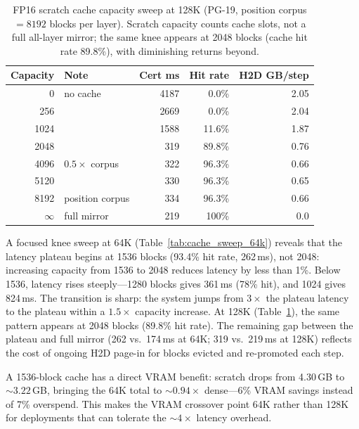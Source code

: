 \documentclass[11pt,a4paper]{article}
\theoremstyle{definition}
\theoremstyle{remark}
\begin{document}
\begin{table}[H]
\centering
\caption{FP16 scratch cache capacity sweep at 128K (PG-19, position corpus${}=8192$ blocks per layer).  Scratch capacity counts cache slots, not a full all-layer mirror; the same knee appears at 2048 blocks (cache hit rate 89.8\%), with diminishing returns beyond.}
\label{tab:cache_sweep_128k}
\small
\begin{tabular}{rlrrr}
\toprule
\textbf{Capacity} & \textbf{Note} & \textbf{Cert ms} & \textbf{Hit rate} & \textbf{H2D GB/step} \\
\midrule
0       & no cache       & 4187 & 0.0\%   & 2.05 \\
256     &                & 2669 & 0.0\%   & 2.04 \\
1024    &                & 1588 & 11.6\%  & 1.87 \\
\rowcolor[gray]{0.92}
2048    &                & 319  & 89.8\%  & 0.76 \\
4096    & $0.5\times$ corpus & 322 & 96.3\% & 0.66 \\
5120    &                & 330  & 96.3\%  & 0.65 \\
8192    & position corpus & 334 & 96.3\% & 0.66 \\
\rowcolor[gray]{0.92}
$\infty$ & full mirror  & 219  & 100\%   & 0.0 \\
\bottomrule
\end{tabular}
\end{table}

A focused knee sweep at 64K (Table~\ref{tab:cache_sweep_64k}) reveals that the latency plateau begins at 1536 blocks (93.4\% hit rate, 262\,ms), not 2048: increasing capacity from 1536 to 2048 reduces latency by less than 1\%.  Below 1536, latency rises steeply---1280 blocks gives 361\,ms (78\% hit), and 1024 gives 824\,ms.  The transition is sharp: the system jumps from $3\times$ the plateau latency to the plateau within a $1.5\times$ capacity increase.  At 128K (Table~\ref{tab:cache_sweep_128k}), the same pattern appears at 2048 blocks (89.8\% hit rate).  The remaining gap between the plateau and full mirror (262 vs.\ 174\,ms at 64K; 319 vs.\ 219\,ms at 128K) reflects the cost of ongoing H2D page-in for blocks evicted and re-promoted each step.

A 1536-block cache has a direct VRAM benefit: scratch drops from 4.30\,GB to ${\sim}3.22$\,GB, bringing the 64K total to ${\sim}0.94\times$ dense---6\% VRAM savings instead of 7\% overspend.  This makes the VRAM crossover point 64K rather than 128K for deployments that can tolerate the ${\sim}4\times$ latency overhead.
\end{document}
